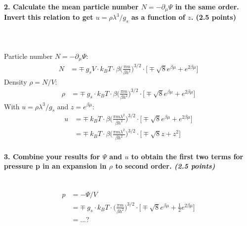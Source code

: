 \paragraph{2. Calculate the mean particle number 
    $N =-\partial_\mu\Psi$ in the same order. Invert this 
    relation to get $u=\rho\lambda^3/g_s$ as a function of $z$. 
    (2.5 points)
} \ \\
    \\
    Particle number $N=-\partial_\mu\Psi$:
    \begin{align}
        N
        &=\mp\ g_sV\cdot k_BT\cdot\beta\bigg(
            \frac{\pi m}{\beta h^2}
        \bigg)^{3/2}\cdot\bigg[
            \mp\sqrt{8}e^{\beta\mu}
            +e^{2\beta\mu}
        \bigg]
    \end{align}
    Density $\rho=N/V$:
    \begin{align}
        \rho&=\mp\ g_s\cdot k_BT\cdot\beta\bigg(
            \frac{\pi m}{\beta h^2}
        \bigg)^{3/2}\cdot\bigg[
            \mp\sqrt{8}e^{\beta\mu}
            +e^{2\beta\mu}
        \bigg]
    \end{align}
    With $u=\rho\lambda^3/g_s$ and $z=e^{\beta\mu}$:
    \begin{align}
        u
        &=\mp\ k_BT\cdot\beta\bigg(
            \frac{\pi m\lambda^2}{\beta h^2}
        \bigg)^{3/2}\cdot\bigg[
            \mp\sqrt{8}e^{\beta\mu}
            +e^{2\beta\mu}
        \bigg] \\
        &=\mp\ k_BT\cdot\beta\bigg(
            \frac{\pi m\lambda^2}{\beta h^2}
        \bigg)^{3/2}\cdot\bigg[
            \mp\sqrt{8}z
            +z^2
        \bigg]
    \end{align}

\paragraph{3. Combine your results for $\Psi$ and $u$ to obtain 
    the first two terms for pressure p in an expansion in 
    $\rho$ to second order. \textit{(2.5 points)}
} \ \\
    \begin{align}
        p
        &=-\Psi/V \\
        &=\mp\ g_s\cdot k_BT\cdot\bigg(
            \frac{\pi m}{\beta h^2}
        \bigg)^{3/2}\cdot\bigg[
            \mp\sqrt{8}e^{\beta\mu}
            +\frac{1}{2}e^{2\beta\mu}
        \bigg] \\
        &=...?
    \end{align}

